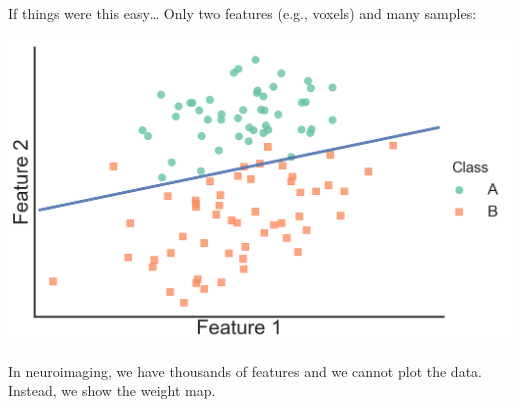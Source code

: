 \documentclass[11pt]{beamer}
\begin{document}
\begin{frame}{If things were this easy\ldots}
    Only two features (e.g., voxels) and many samples:

    \begin{center}
        \includegraphics[scale=0.3]{figures/grad_descent_result.png}        
    \end{center}

    In neuroimaging, we have thousands of features and we cannot plot the data.
    Instead, we show the weight map.

\end{frame}
\end{document}
